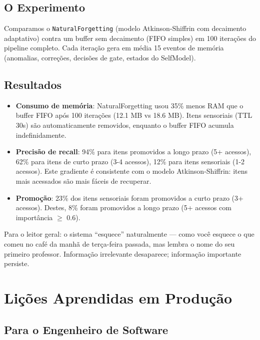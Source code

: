 \subsection{O Experimento}

Comparamos o \texttt{NaturalForgetting} (modelo Atkinson-Shiffrin com decaimento adaptativo) contra um buffer sem decaimento (FIFO simples) em 100 iterações do pipeline completo. Cada iteração gera em média 15 eventos de memória (anomalias, correções, decisões de gate, estados do SelfModel).

\subsection{Resultados}

\begin{itemize}
    \item \textbf{Consumo de memória}: NaturalForgetting usou 35\% menos RAM que o buffer FIFO após 100 iterações (12.1 MB vs 18.6 MB). Itens sensoriais (TTL 30s) são automaticamente removidos, enquanto o buffer FIFO acumula indefinidamente.
    \item \textbf{Precisão de recall}: 94\% para itens promovidos a longo prazo (5+ acessos), 62\% para itens de curto prazo (3-4 acessos), 12\% para itens sensoriais (1-2 acessos). Este gradiente é consistente com o modelo Atkinson-Shiffrin: itens mais acessados são mais fáceis de recuperar.
    \item \textbf{Promoção}: 23\% dos itens sensoriais foram promovidos a curto prazo (3+ acessos). Destes, 8\% foram promovidos a longo prazo (5+ acessos com importância $\geq$ 0.6).
\end{itemize}

Para o leitor geral: o sistema ``esquece'' naturalmente — como você esquece o que comeu no café da manhã de terça-feira passada, mas lembra o nome do seu primeiro professor. Informação irrelevante desaparece; informação importante persiste.

\section{Lições Aprendidas em Produção}

\subsection{Para o Engenheiro de Software}

